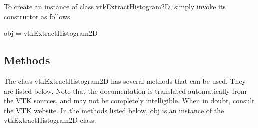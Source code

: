 To create an instance of class vtk\-Extract\-Histogram2\-D, simply invoke its constructor as follows \begin{DoxyVerb}  obj = vtkExtractHistogram2D
\end{DoxyVerb}
 \hypertarget{vtkwidgets_vtkxyplotwidget_Methods}{}\subsection{Methods}\label{vtkwidgets_vtkxyplotwidget_Methods}
The class vtk\-Extract\-Histogram2\-D has several methods that can be used. They are listed below. Note that the documentation is translated automatically from the V\-T\-K sources, and may not be completely intelligible. When in doubt, consult the V\-T\-K website. In the methods listed below, {\ttfamily obj} is an instance of the vtk\-Extract\-Histogram2\-D class. 
